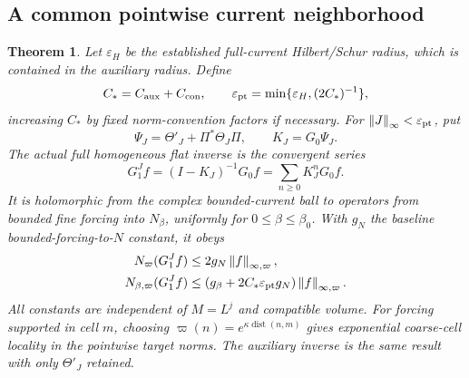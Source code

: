 \documentclass[11pt]{article}
\newtheorem{theorem}{Theorem}[section]
\theoremstyle{remark}
\newcommand{\norm}[1]{\left\|#1\right\|}
\begin{document}
\subsection{A common pointwise current neighborhood}

\begin{theorem}\label{pc-theorem}
Let $\varepsilon_H$ be the established full-current Hilbert/Schur
radius, which is contained in the auxiliary radius. Define
\begin{equation}\label{pc-radius}
 C_*=C_{\rm aux}+C_{\rm con},\qquad
 \varepsilon_{\rm pt}
       =\min\{\varepsilon_H,(2C_*)^{-1}\},
\end{equation}
increasing $C_*$ by fixed norm-convention factors if necessary.
For $\norm{J}_\infty<\varepsilon_{\rm pt}$, put
\begin{equation}\label{pc-full-perturbation}
 \Psi_J=\Theta'_J+\Pi^*\Theta_J\Pi,\qquad
 K_J=G_0\Psi_J.
\end{equation}
The actual full homogeneous flat inverse is the convergent series
\begin{equation}\label{pc-neumann-inverse}
 G_1^Jf=(I-K_J)^{-1}G_0f
                  =\sum_{n\ge0}K_J^nG_0f.
\end{equation}
It is holomorphic from the complex bounded-current ball to operators
from bounded fine forcing into $N_\beta$, uniformly for
$0\le\beta\le\beta_0$. With $g_N$ the baseline bounded-forcing-to-$N$
constant, it obeys
\begin{align}
 N_\varpi(G_1^Jf)
       &\le2g_N\norm{f}_{\infty,\varpi},
       \label{pc-inverse-N}\\
 N_{\beta,\varpi}(G_1^Jf)
       &\le(g_\beta+2C_*\varepsilon_{\rm pt}g_N)
                              \norm{f}_{\infty,\varpi}.
       \label{pc-inverse-Nbeta}
\end{align}
All constants are independent of $M=L^j$ and compatible volume.
For forcing supported in cell $m$, choosing
$\varpi(n)=e^{\kappa\operatorname{dist}(n,m)}$ gives exponential
coarse-cell locality in the pointwise target norms. The auxiliary
inverse is the same result with only $\Theta'_J$ retained.
\end{theorem}
\end{document}
